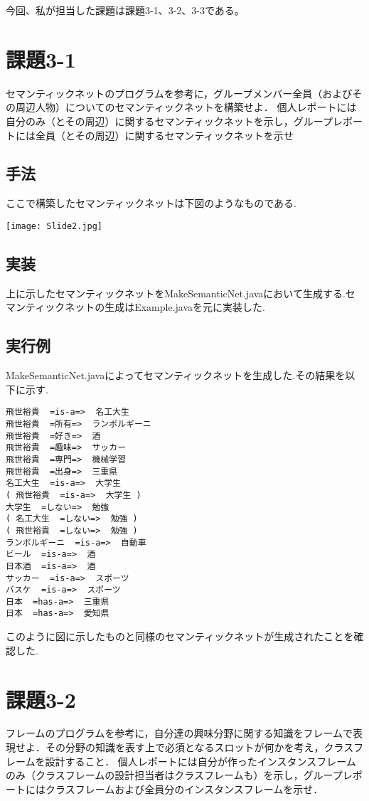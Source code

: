 \documentclass[a4j]{jarticle}
\begin{document}
今回、私が担当した課題は課題3-1、3-2、3-3である。

\section{課題3-1}
\begin{screen}
 セマンティックネットのプログラムを参考に，グループメンバー全員（およびその周辺人物）についてのセマンティックネットを構築せよ．
個人レポートには自分のみ（とその周辺）に関するセマンティックネットを示し，グループレポートには全員（とその周辺）に関するセマンティックネットを示せ
\end{screen}

\subsection{手法}
ここで構築したセマンティックネットは下図のようなものである.

\texttt{[image: Slide2.jpg]}

\subsection{実装}
上に示したセマンティックネットをMakeSemanticNet.javaにおいて生成する.セマンティックネットの生成はExample.javaを元に実装した.

\subsection{実行例}
MakeSemanticNet.javaによってセマンティックネットを生成した.その結果を以下に示す.

\begin{screen}
\begin{verbatim}
飛世裕貴  =is-a=>  名工大生
飛世裕貴  =所有=>  ランボルギーニ
飛世裕貴  =好き=>  酒
飛世裕貴  =趣味=>  サッカー
飛世裕貴  =専門=>  機械学習
飛世裕貴  =出身=>  三重県
名工大生  =is-a=>  大学生
( 飛世裕貴  =is-a=>  大学生 )
大学生  =しない=>  勉強
( 名工大生  =しない=>  勉強 )
( 飛世裕貴  =しない=>  勉強 )
ランボルギーニ  =is-a=>  自動車
ビール  =is-a=>  酒
日本酒  =is-a=>  酒
サッカー  =is-a=>  スポーツ
バスケ  =is-a=>  スポーツ
日本  =has-a=>  三重県
日本  =has-a=>  愛知県
\end{verbatim}
\end{screen}

このように図に示したものと同様のセマンティックネットが生成されたことを確認した.
\section{課題3-2}
\begin{screen}
フレームのプログラムを参考に，自分達の興味分野に関する知識をフレームで表現せよ．その分野の知識を表す上で必須となるスロットが何かを考え，クラスフレームを設計すること．
個人レポートには自分が作ったインスタンスフレームのみ（クラスフレームの設計担当者はクラスフレームも）を示し，グループレポートにはクラスフレームおよび全員分のインスタンスフレームを示せ．
\end{screen}
\end{document}
